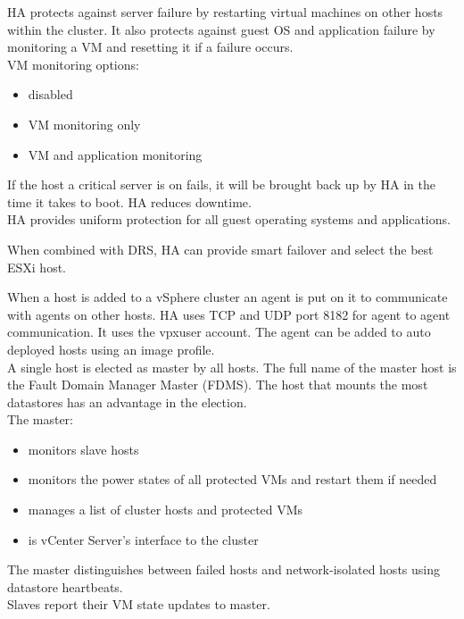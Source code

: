 HA protects against server failure by restarting virtual machines on other
hosts within the cluster. It also protects against guest OS and application
failure by monitoring a VM and resetting it if a failure occurs.\\

VM monitoring options:

\begin{itemize}
\item disabled
\item VM monitoring only
\item VM and application monitoring
\end{itemize}

If the host a critical server is on fails, it will be brought back up by HA
in the time it takes to boot. HA reduces downtime.\\

HA provides uniform protection for all guest operating systems and
applications.

When combined with DRS, HA can provide smart failover and select the best
ESXi host.

When a host is added to a vSphere cluster an agent is put on it to
communicate with agents on other hosts. HA uses TCP and UDP port 8182 for
agent to agent communication. It uses the vpxuser account. The agent can
be added to auto deployed hosts using an image profile.\\

A single host is elected as master by all hosts. The full name of the master
host is the Fault Domain Manager Master (FDMS). The host that mounts the most
datastores has an advantage in the election.\\

The master:

\begin{itemize}
\item monitors slave hosts
\item monitors the power states of all protected VMs and restart them if needed
\item manages a list of cluster hosts and protected VMs
\item is vCenter Server's interface to the cluster
\end{itemize}

The master distinguishes between failed hosts and network-isolated hosts using
datastore heartbeats.\\

Slaves report their VM state updates to master.\\

